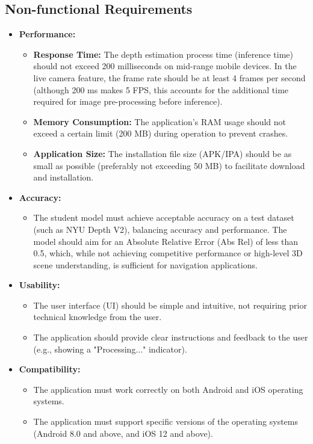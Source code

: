 \subsection{Non-functional Requirements}
\label{subsec:non_functional_reqs}
\begin{itemize}
    \item \textbf{Performance:}
    \begin{itemize}
        \item \textbf{Response Time:} The depth estimation process time (inference time) should not exceed 200 milliseconds on mid-range mobile devices. In the live camera feature, the frame rate should be at least 4 frames per second (although 200 ms makes 5 FPS, this accounts for the additional time required for image pre-processing before inference).
        \item \textbf{Memory Consumption:} The application's RAM usage should not exceed a certain limit (200 MB) during operation to prevent crashes.
        \item \textbf{Application Size:} The installation file size (APK/IPA) should be as small as possible (preferably not exceeding 50 MB) to facilitate download and installation.
    \end{itemize}

    \item \textbf{Accuracy:}
    \begin{itemize}
        \item The student model must achieve acceptable accuracy on a test dataset (such as NYU Depth V2), balancing accuracy and performance. The model should aim for an Absolute Relative Error (Abs Rel) of less than 0.5, which, while not achieving competitive performance or high-level 3D scene understanding, is sufficient for navigation applications.
    \end{itemize}

    \item \textbf{Usability:}
    \begin{itemize}
        \item The user interface (UI) should be simple and intuitive, not requiring prior technical knowledge from the user.
        \item The application should provide clear instructions and feedback to the user (e.g., showing a "Processing..." indicator).
    \end{itemize}

    \item \textbf{Compatibility:}
    \begin{itemize}
        \item The application must work correctly on both Android and iOS operating systems.
        \item The application must support specific versions of the operating systems (Android 8.0 and above, and iOS 12 and above).
    \end{itemize}
\end{itemize}

